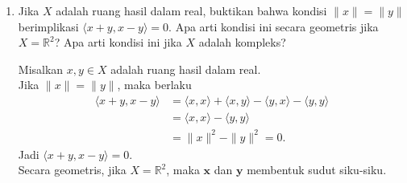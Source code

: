 \documentclass{article}
\newcommand\rightAngle[4]{
  \pgfmathanglebetweenpoints{\pgfpointanchor{#2}{center}}{\pgfpointanchor{#1}{center}}
  \coordinate (tmpRA) at ($(#2)+(\pgfmathresult+45:#4)$);
  \draw[red!60!black,thick] ($(#2)!(tmpRA)!(#1)$) -- (tmpRA) -- ($(#2)!(tmpRA)!(#3)$);
}
\theoremstyle{definition}
\begin{document}
\begin{enumerate}
  \item Jika $X$ adalah ruang hasil dalam real, buktikan bahwa kondisi $\|x\| = \|y\|$ berimplikasi $\langle x + y, x - y \rangle = 0$. Apa arti kondisi ini secara geometris jika $X = \mathbb{R}^2$? Apa arti kondisi ini jika $X$ adalah kompleks?
  \begin{solution}
    Misalkan $x,y\in X$ adalah ruang hasil dalam real.\\
    Jika $\|x\|=\|y\|$, maka berlaku
    \begin{align*}
      \langle x+y,x-y \rangle&=\langle x,x \rangle+\langle x,y \rangle-\langle y,x \rangle-\langle y,y \rangle\\
      &=\langle x,x \rangle-\langle y,y \rangle\\
      &=\|x\|^2-\|y\|^2=0.
    \end{align*}
    Jadi $\langle x+y,x-y \rangle=0$.\\

    Secara geometris, jika $X=\mathbb{R}^2$, maka $\mathbf{x}$ dan $\mathbf{y}$ membentuk sudut siku-siku.
    \begin{center}
    \end{center}
  \end{solution}
  
  \setcounter{enumi}{7}


\end{enumerate}
\end{document}
